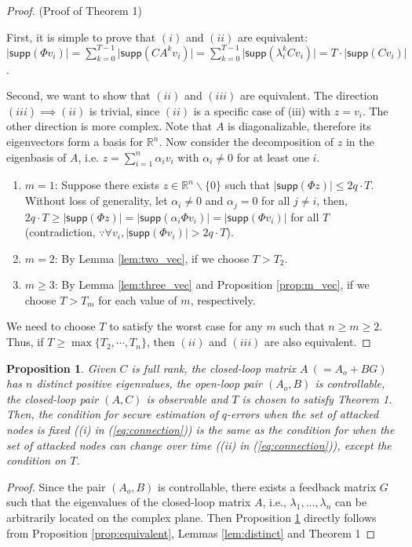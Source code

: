 \documentclass[journal]{IEEEtran}
\newtheorem{prop}{\bf{Proposition}}
\begin{document}
\begin{proof} (Proof of Theorem 1)

First, it is simple to prove that $(i)$ and $(ii)$ are equivalent: $\lvert \textsf{supp} (\Phi v_i) \rvert = \sum_{k=0}^{T-1} \lvert \textsf{supp} (CA^k v_i ) \rvert = \sum_{k=0}^{T-1} \lvert  \textsf{supp} (\lambda_i^k C v_i )\rvert  = T\cdot  \lvert \textsf{supp} (C v_i) \rvert  $. 

Second, we want to show that $(ii)$ and $(iii)$ are equivalent. The direction $(iii) \implies (ii)$ is trivial, since $(ii)$ is a specific case of (iii) with $z = v_i$. The other direction is more complex. Note that $A$ is diagonalizable, therefore its eigenvectors form a basis for $\mathbb{R}^n$. Now consider the decomposition of $z $ in the eigenbasis of $A$, i.e. $z = \sum_{i=1}^n \alpha_i v_i$ with $\alpha_i \neq 0$ for at least one $i$. 
\begin{enumerate}
\item $m=1$: Suppose there exists $z \in \mathbb{R}^n \backslash \{ 0\}$ such that $ \lvert \textsf{supp} (\Phi z) \rvert \le 2 q \cdot T$. Without loss of generality, let $\alpha_i \neq 0$ and $\alpha_j= 0$ for all $j \neq i$, then, $2 q \cdot T \ge \lvert \textsf{supp} (\Phi z) \rvert = \lvert \textsf{supp} (\alpha_i \Phi v_i) \rvert = \lvert \textsf{supp} (\Phi v_i) \rvert $ for all $T$ (contradiction, $\because \forall v_i, \lvert \textsf{supp} (\Phi v_i) \rvert  > 2 q \cdot T$). 
\item $m=2$: By Lemma \ref{lem:two_vec}, if we choose $T>T_2$.
\item $m\ge 3$: By Lemma \ref{lem:three_vec} and Proposition \ref{prop:m_vec}, if we choose $T>T_m$ for each value of $m$, respectively.
\end{enumerate}
We need to choose $T$ to satisfy the worst case for any $m$ such that $n \ge m \ge 2$. Thus, if $T \ge \max \{ T_2, \cdots, T_n \}$, then $(ii)$ and $(iii)$ are also equivalent.
\end{proof}



\begin{prop}\label{prop:equivalent2}
Given $C$ is full rank, the closed-loop matrix $A~(=A_o+BG)$ has $n$ distinct positive eigenvalues, the open-loop pair $(A_o,B)$ is controllable, the closed-loop pair $(A,C)$ is observable and $T$ is chosen to satisfy Theorem 1. Then, the condition for secure estimation of $q$-errors when the set of attacked nodes is fixed ((i) in (\ref{eq:connection})) is the same as the condition for when the set of attacked nodes can change over time ((ii) in (\ref{eq:connection})), except the condition on $T$.
\end{prop}
\begin{proof}
Since the pair $(A_o,B)$ is controllable, there exists a feedback matrix $G$ such that the eigenvalues of the closed-loop matrix $A$, i.e., $\lambda_1, ..., \lambda_n$ can be arbitrarily located on the complex plane. Then Proposition \ref{prop:equivalent2} directly follows from Proposition \ref{prop:equivalent}, Lemmas \ref{lem:distinct} and Theorem 1 
\end{proof}
\end{document}
